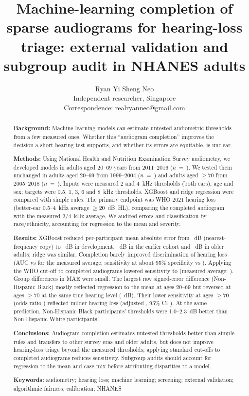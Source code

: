 \documentclass[11pt]{article}
\title{Machine-learning completion of sparse audiograms for hearing-loss triage: external validation and subgroup audit in \NTotal{} NHANES adults}
\author{Ryan Yi Sheng Neo\\[2pt]
\small Independent researcher, Singapore\\
\small Correspondence: \href{mailto:realryanneo@gmail.com}{realryanneo@gmail.com}}
\date{}
\begin{document}
\maketitle

\begin{abstract}
\noindent\textbf{Background:} Machine-learning models can estimate untested audiometric thresholds from a few measured ones. Whether this ``audiogram completion'' improves the decision a short hearing test supports, and whether its errors are equitable, is unclear.

\noindent\textbf{Methods:} Using National Health and Nutrition Examination Survey audiometry, we developed models in adults aged 20--69 years from 2011--2016 ($n$~=~\NDev{}). We tested them unchanged in adults aged 20--69 from 1999--2004 ($n$~=~\NExtA{}) and adults aged $\geq$70 from 2005--2018 ($n$~=~\NExtB{}). Inputs were measured 2 and 4~kHz thresholds (both ears), age and sex; targets were 0.5, 1, 3, 6 and 8~kHz thresholds. XGBoost and ridge regression were compared with simple rules. The primary endpoint was WHO 2021 hearing loss (better-ear 0.5--4~kHz average $\geq$20~dB~HL), comparing the completed audiogram with the measured 2/4~kHz average. We audited errors and classification by race/ethnicity, accounting for regression to the mean and severity.

\noindent\textbf{Results:} XGBoost reduced per-participant mean absolute error from \MaeCopyDev{}~dB (nearest-frequency copy) to \MaeXgbDev{}~dB in development, \MaeXgbExtA{}~dB in the earlier cohort and \MaeXgbExtB{}~dB in older adults; ridge was similar. Completion barely improved discrimination of hearing loss (AUC \AucXgbTwentyDev{} vs \AucHfaTwentyDev{} for the measured average; sensitivity at about 95\% specificity \MsSensXgbDev{} vs \MsSensHfaDev{}). Applying the WHO cut-off to completed audiograms lowered sensitivity to \SensXgbTwentyDev{} (measured average: \SensHfaTwentyDev{}). Group differences in MAE were small. The largest raw signed-error difference (Non-Hispanic Black) mostly reflected regression to the mean at ages 20--69 but reversed at ages $\geq$70 at the same true hearing level (\EffCondBlackExtB{}~dB). Their lower sensitivity at ages $\geq$70 (odds ratio \OrRawBlackExtB{}) reflected milder hearing loss (adjusted \OrCondBlackExtB{}, 95\% CI \OrCiCondBlackExtB). At the same prediction, Non-Hispanic Black participants' thresholds were 1.0--2.3~dB better than Non-Hispanic White participants'.

\noindent\textbf{Conclusions:} Audiogram completion estimates untested thresholds better than simple rules and transfers to other survey eras and older adults, but does not improve hearing-loss triage beyond the measured thresholds; applying standard cut-offs to completed audiograms reduces sensitivity. Subgroup audits should account for regression to the mean and case mix before attributing disparities to a model.

\medskip\noindent\textbf{Keywords:} audiometry; hearing loss; machine learning; screening; external validation; algorithmic fairness; calibration; NHANES
\end{abstract}
\end{document}
